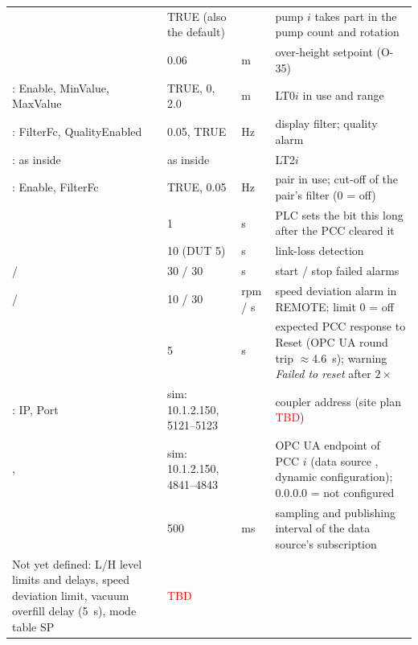 \documentclass[11pt,a4paper]{article}
\newcommand{\TBD}{\textcolor{red}{TBD}}
\begin{document}
\begin{small}
\begin{longtable}{@{}P{58mm}P{24mm}P{10mm}P{55mm}@{}}
 & TRUE (also the default) & & pump $i$ takes part in the pump count and rotation \\
 & 0.06 & m & over-height setpoint (O-35) \\
: Enable, MinValue, MaxValue & TRUE, 0, 2.0 & m & LT0$i$ in use and range \\
: FilterFc, QualityEnabled & 0.05, TRUE & Hz & display filter; quality alarm \\
: as inside & as inside & & LT2$i$ \\
: Enable, FilterFc & TRUE, 0.05 & Hz & pair in use; cut-off of the pair's filter (0 = off) \\
 & 1 & s & PLC sets the bit this long after the PCC cleared it \\
 & 10 (DUT 5) & s & link-loss detection \\
 /  & 30 / 30 & s & start / stop failed alarms \\
 /  & 10 / 30 & rpm / s & speed deviation alarm in REMOTE; limit 0 = off \\
 & 5 & s & expected PCC response to Reset (OPC UA round trip $\approx$4.6~s); warning \emph{Failed to reset} after $2\times$ \\
: IP, Port & sim: 10.1.2.150, 5121--5123 & & coupler address (site plan \TBD) \\
,  & sim: 10.1.2.150, 4841--4843 & & OPC UA endpoint of PCC $i$ (data source , dynamic configuration); 0.0.0.0 = not configured \\
 & 500 & ms & sampling and publishing interval of the data source's subscription \\
Not yet defined: L/H level limits and delays, speed deviation limit, vacuum overfill delay (5~s), mode table SP & \TBD & &  \\
\end{longtable}
\end{small}
\end{document}
